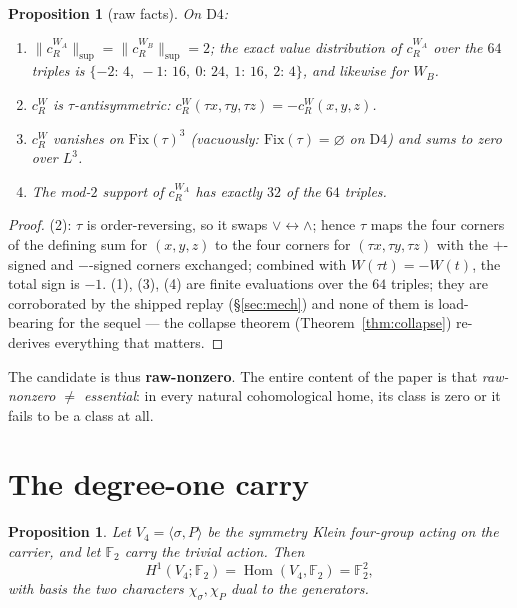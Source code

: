 \documentclass[11pt]{article}
\newtheorem{proposition}[theorem]{Proposition}
\theoremstyle{definition}
\theoremstyle{remark}
\newcommand{\F}{\mathbb{F}}
\newcommand{\Dfour}{\mathrm{D4}}
\newcommand{\Hom}{\operatorname{Hom}}
\newcommand{\cR}{c_R^W}
\newcommand{\WA}{W_{\!A}}
\newcommand{\WB}{W_{\!B}}
\begin{document}
\begin{proposition}[raw facts]\label{prop:raw}
On $\Dfour$:
\begin{enumerate}
\item $\|c_R^{\WA}\|_{\sup}=\|c_R^{\WB}\|_{\sup}=2$; the exact value distribution of $c_R^{\WA}$ over the $64$ triples is $\{-2{:}\,4,\ -1{:}\,16,\ 0{:}\,24,\ 1{:}\,16,\ 2{:}\,4\}$, and likewise for $\WB$.
\item $\cR$ is $\tau$-antisymmetric: $\cR(\tau x,\tau y,\tau z)=-\cR(x,y,z)$.
\item $\cR$ vanishes on $\mathrm{Fix}(\tau)^3$ (vacuously: $\mathrm{Fix}(\tau)=\varnothing$ on $\Dfour$) and sums to zero over $L^3$.
\item The mod-$2$ support of $c_R^{\WA}$ has exactly $32$ of the $64$ triples.
\end{enumerate}
\end{proposition}

\begin{proof}
(2): $\tau$ is order-reversing, so it swaps $\vee\leftrightarrow\wedge$; hence $\tau$ maps the four corners of the defining sum for $(x,y,z)$ to the four corners for $(\tau x,\tau y,\tau z)$ with the $+$-signed and $-$-signed corners exchanged; combined with $W(\tau t)=-W(t)$, the total sign is $-1$. (1), (3), (4) are finite evaluations over the $64$ triples; they are corroborated by the shipped replay (\S\ref{sec:mech}) and none of them is load-bearing for the sequel --- the collapse theorem (Theorem~\ref{thm:collapse}) re-derives everything that matters.
\end{proof}

The candidate is thus \textbf{raw-nonzero}. The entire content of the paper is that \emph{raw-nonzero $\ne$ essential}: in every natural cohomological home, its class is zero or it fails to be a class at all.

\section{The degree-one carry}\label{sec:carry}

\begin{proposition}\label{prop:h1}
Let $V_4=\langle\sigma,P\rangle$ be the symmetry Klein four-group acting on the carrier, and let $\F_2$ carry the trivial action. Then
\[
H^1(V_4;\F_2)=\Hom(V_4,\F_2)=\F_2^2,
\]
with basis the two characters $\chi_\sigma,\chi_P$ dual to the generators.
\end{proposition}
\end{document}
